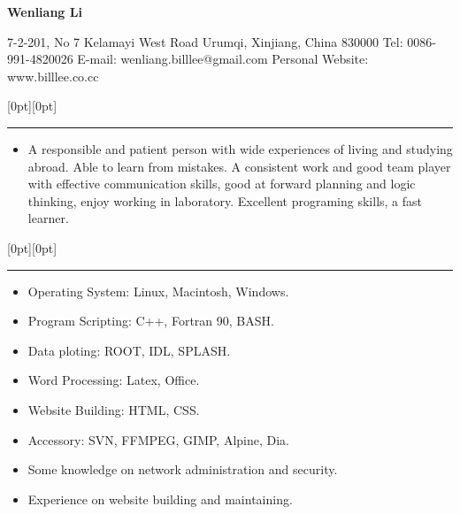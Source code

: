 \documentclass[a4paper,12pt]{letter}
\begin{document}
\begin{center}
\textbf{\Huge Wenliang Li} \linebreak

\textrm{\normalsize	7-2-201, No 7 Kelamayi West Road} \linebreak
\textrm{\normalsize Urumqi, Xinjiang, China 830000} \linebreak
\textrm{\normalsize Tel: 0086-991-4820026} \linebreak
\textrm{\normalsize E-mail: wenliang.billlee@gmail.com} \linebreak
\textrm{\normalsize Personal Website: www.billlee.co.cc}
\end{center}


\raisebox{0pt}[0pt][0pt]{\Large\textbf{\raisebox{-3.5ex}{Profile}}}

\rule[-0.5cm]{10cm}{1pt}
\begin{itemize}
\item \textrm{\normalsize A responsible and patient person with wide experiences of living and studying abroad. Able to learn from mistakes. A consistent work and good team player with effective communication skills, good at forward planning and logic thinking, enjoy working in laboratory. Excellent programing skills, a fast learner.}
\end{itemize}


\raisebox{0pt}[0pt][0pt]{\Large\textbf{\raisebox{-3.5ex}{Computing Skill}}}
 
\rule[-0.5cm]{10cm}{1pt}
\begin{itemize}
\item \textrm{\normalsize Operating System: Linux, Macintosh, Windows.}
\item \textrm{\normalsize Program Scripting: C++, Fortran 90, BASH.}
\item \textrm{\normalsize Data ploting: ROOT, IDL, SPLASH.}
\item \textrm{\normalsize Word Processing: Latex, Office.}
\item \textrm{\normalsize Website Building: HTML, CSS.}
\item \textrm{\normalsize Accessory: SVN, FFMPEG, GIMP, Alpine, Dia.}
\item \textrm{\normalsize Some knowledge on network administration and security.}
\item \textrm{\normalsize Experience on website building and maintaining.}
\end{itemize}
\end{document}
